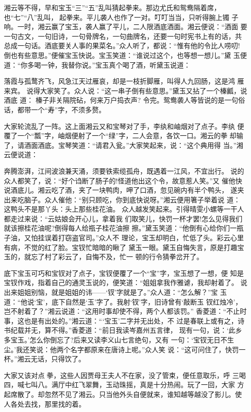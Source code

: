 湘云等不得，早和宝玉“三”“五”乱叫猜起拳来。那边尤氏和鸳鸯隔着席，
也“七”“八”乱叫，起拳来。平儿袭人也作了一对。叮叮当当，只听得腕上镯
子响。一时，湘云赢了宝玉，袭人赢了平儿，二人限酒底酒面。湘云便说：“酒面
要一句古文，一句旧诗，一句骨牌名，一句曲牌名，还要一句时宪书上有的话，共
总成一句话。酒底要关人事的果菜名。”众人听了，都说：“惟有他的令比人唠叨!
倒也有些意思。”便催宝玉快说。宝玉笑道：“谁说过这个，也等想一想儿。”黛
玉便道：“你多喝一钟，我替你说。”宝玉真个喝了酒，听黛玉说道：

落霞与孤鹜齐飞，风急江天过雁哀，却是一枝折脚雁，叫得人九回肠，这是鸿
雁来宾。
说得大家笑了。众人说：“这一串子倒有些意思。”黛玉又拈了一个榛瓤，说酒底
道：
榛子非关隔院砧，何来万户捣衣声?
令完。鸳鸯袭人等皆说的是一句俗话，都带一个“寿”字，不须多赘。

大家轮流乱了一阵。这上面湘云又和宝琴对了手，李纨和岫烟对了点子。李纨
便覆了一个“瓢”字，岫烟便射了一个“绿”字，二人会意，各饮一口。湘云的拳
却输了，请酒面酒底。宝琴笑道：“请君入瓮。”大家笑起来，说：“这个典用得
当。”湘云便说道：

奔腾澎湃，江间波浪兼天涌，须要铁索缆孤舟，既遇着一江风，不宜出行。
说的众人都笑了，说：“好个诌断了肠子的!怪道他出这个令，故意惹人笑。”又
催他快说酒底儿。湘云吃了酒，夹了一块鸭肉，呷了口酒，忽见碗内有半个鸭头，
遂夹出来吃脑子。众人催他：“别只顾吃，你到底快说呀。”湘云便用箸子举着说
道：
这鸭头不是那丫头：头上那些桂花油。
众人越发笑起来。引得晴雯小螺等一干人都走过来说：“云姑娘会开心儿，拿着我
们取笑儿，快罚一杯才罢!怎么见得我们就该擦桂花油呢?倒得每人给瓶子桂花油擦
擦。”黛玉笑道：“他倒有心给你们一瓶子油，又怕挂误着打窃盗官司。”众人不
理论，宝玉却明白，忙低了头。彩云心里有病，不觉的红了脸。宝钗忙暗暗的瞅了
黛玉一眼。黛玉自悔失言，原是打趣宝玉的，就忘了村了彩云了，自悔不及，忙一
顿的行令猜拳岔开了。

底下宝玉可巧和宝钗对了点子，宝钗便覆了一个“宝”字，宝玉想了一想，便
知是宝钗作戏，指着自己的通灵玉说的，便笑道：“姐姐拿我作雅谑，我却射着了。
说出来姐姐别恼，就是姐姐的讳——‘钗’字就是了。”众人道：“怎么解？”宝
玉道：“他说‘宝’，底下自然是‘玉’字了。我射‘钗’字，旧诗曾有‘敲断玉
钗红烛冷’，岂不射着了？”湘云说道：“这用时事却使不得，两个人都该罚。”
香菱道：“不止时事，这也是有出处的。”湘云道：“‘宝玉’二字并无出处，不
过是春联上或有之，诗书纪载并无，算不得。”香菱道：“前日我读岑嘉州五言律，
现有一句，说：‘此乡多宝玉。’怎么你倒忘了?后来又读李义山七言绝句，又有
一句：‘宝钗无日不生尘。’我还笑说：他两个名字都原来在唐诗上呢。”众人笑
说：“这可问住了，快罚一杯。”湘云无话，只得饮了。

大家又该对点拳，这些人因贾母王夫人不在家，没了管束，便任意取乐，呼
三喝四，喊七叫八。满厅中红飞翠舞，玉动珠摇，真是十分热闹。玩了一回，大家
方起席散了。却忽然不见了湘云。只当他外头自便就来，谁知越等越没了影儿。使
人各处去找，那里找的着。

